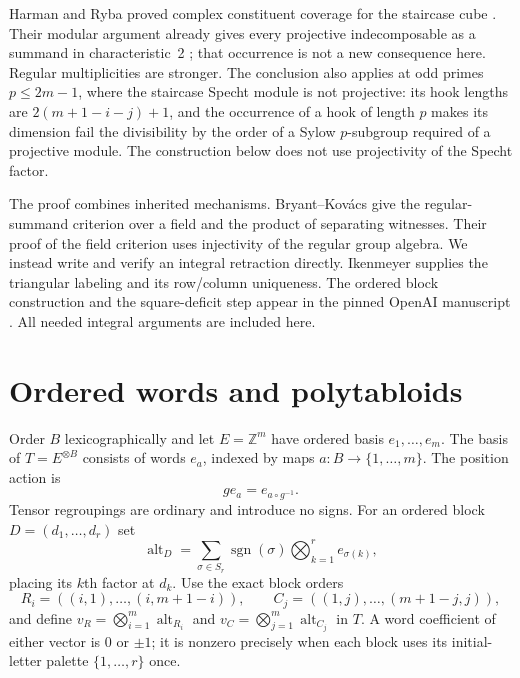 \documentclass[11pt]{article}
\newcommand{\Z}{\mathbb Z}
\newcommand{\sgn}{\operatorname{sgn}}
\numberwithin{equation}{section}
\begin{document}
Harman and Ryba proved complex constituent coverage for the staircase cube \cite[Theorem~1.1]{HR}. Their modular argument already gives every projective indecomposable as a summand in characteristic~2 \cite[Section~3, Remark~3.3]{HR}; that occurrence is not a new consequence here. Regular multiplicities are stronger. The conclusion also applies at odd primes $p\le2m-1$, where the staircase Specht module is not projective: its hook lengths are $2(m+1-i-j)+1$, and the occurrence of a hook of length $p$ makes its dimension fail the divisibility by the order of a Sylow $p$-subgroup required of a projective module. The construction below does not use projectivity of the Specht factor.

The proof combines inherited mechanisms. Bryant--Kov\'acs \cite[Lemma~(ii)--(iii)]{BK} give the regular-summand criterion over a field and the product of separating witnesses. Their proof of the field criterion uses injectivity of the regular group algebra. We instead write and verify an integral retraction directly. Ikenmeyer \cite[Sections~4--5]{Ik} supplies the triangular labeling and its row/column uniqueness. The ordered block construction and the square-deficit step appear in the pinned OpenAI manuscript \cite[Sections~2--3]{OAI}. All needed integral arguments are included here.

\section{Ordered words and polytabloids}\label{sec:words}
Order $B$ lexicographically and let $E=\Z^m$ have ordered basis $e_1,\ldots,e_m$. The basis of $T=E^{\otimes B}$ consists of words $e_a$, indexed by maps $a:B\to\{1,\ldots,m\}$. The position action is
\[
 g e_a=e_{a\circ g^{-1}}.
\]
Tensor regroupings are ordinary and introduce no signs. For an ordered block $D=(d_1,\ldots,d_r)$ set
\[
 \operatorname{alt}_D=\sum_{\sigma\in S_r}\sgn(\sigma)
       \bigotimes_{k=1}^r e_{\sigma(k)},
\]
placing its $k$th factor at $d_k$. Use the exact block orders
\[
 R_i=((i,1),\ldots,(i,m+1-i)),\qquad
 C_j=((1,j),\ldots,(m+1-j,j)),
\]
and define $v_R=\bigotimes_{i=1}^m\operatorname{alt}_{R_i}$ and
$v_C=\bigotimes_{j=1}^m\operatorname{alt}_{C_j}$ in $T$. A word coefficient of either vector is $0$ or $\pm1$; it is nonzero precisely when each block uses its initial-letter palette $\{1,\ldots,r\}$ once.
\end{document}
